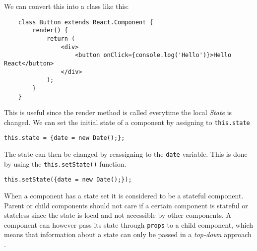 We can convert this into a class like this:
\begin{lstlisting}
    class Button extends React.Component {
        render() {
            return (
                <div>
                    <button onClick={console.log('Hello')}>Hello React</button>
                </div>
            );
        }
    }
\end{lstlisting}
This is useful since the render method is called everytime the local \textit{State} is changed.
We can set the initial state of a component by assigning to \texttt{this.state}
\begin{center}
    \texttt{this.state = \{date = new Date();\};}
\end{center}
The state can then be changed by reassigning to the \texttt{date} variable.
This is done by using the \texttt{this.setState()} function.
\begin{center}
    \texttt{this.setState(\{date = new Date();\});}
\end{center}
When a component has a state set it is considered to be a stateful component. 
Parent or child components should not care if a certain component is stateful or stateless since the state is local and not accessible by other components. 
A component can however pass its state through \texttt{props} to a child component, which means that information about a state can only be passed in a \textit{top-down} approach \cite{ReactJS}.
